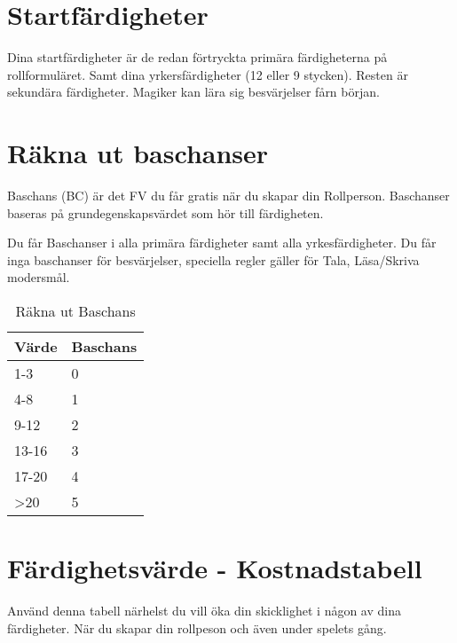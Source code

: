 \documentclass[a4paper, 10pt, titlepage]{article}
\begin{document}
\section{Startfärdigheter}
Dina startfärdigheter är de redan förtryckta primära färdigheterna på rollformuläret.
Samt dina yrkersfärdigheter (12 eller 9 stycken). Resten är sekundära färdigheter.
Magiker kan lära sig besvärjelser fårn början.

\section{Räkna ut baschanser}
Baschans (BC) är det FV du får gratis när du skapar din Rollperson. Baschanser baseras
på grundegenskapsvärdet som hör till färdigheten.

Du får Baschanser i alla primära färdigheter samt alla yrkesfärdigheter.
Du får inga baschanser för besvärjelser, speciella regler gäller för Tala,
Läsa/Skriva modersmål.

\begin{table}[hbp]
  \caption{Räkna ut Baschans}
  \begin{tabular}{|l|l|}
    \hline
    Värde & Baschans \\
    \hline
    1-3   & 0 \\
    \hline
    4-8   & 1 \\
    \hline
    9-12  & 2 \\
    \hline
    13-16 & 3 \\
    \hline
    17-20 & 4 \\
    \hline
    >20   & 5 \\
    \hline
  \end{tabular}
\end{table}

\section{Färdighetsvärde - Kostnadstabell}
Använd denna tabell närhelst du vill öka din skicklighet i
någon av dina färdigheter. När du skapar din rollpeson och
även under spelets gång.
\end{document}
